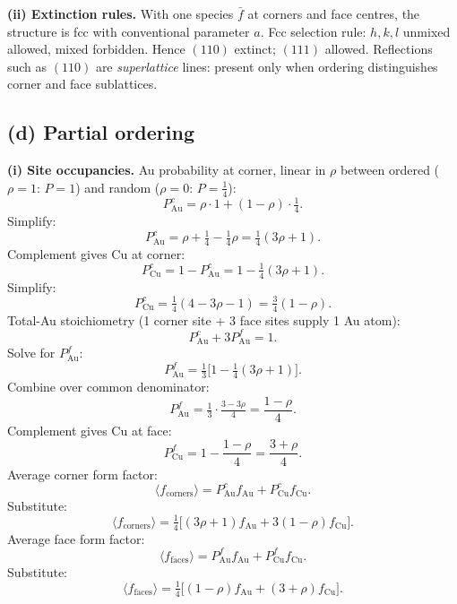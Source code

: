 \documentclass[11pt]{article}
\begin{document}
\textbf{(ii) Extinction rules.} With one species $\bar f$ at corners and face centres, the structure is fcc with conventional parameter $a$. Fcc selection rule: $h,k,l$ unmixed allowed, mixed forbidden. Hence $(110)$ extinct; $(111)$ allowed. Reflections such as $(110)$ are \emph{superlattice} lines: present only when ordering distinguishes corner and face sublattices.

\begin{center}
\end{center}

\subsection*{(d) Partial ordering}

\textbf{(i) Site occupancies.} Au probability at corner, linear in $\rho$ between ordered ($\rho=1$: $P=1$) and random ($\rho=0$: $P=\tfrac14$):
\[ P^c_{\text{Au}}=\rho\cdot 1+(1-\rho)\cdot\tfrac14. \]
Simplify:
\[ P^c_{\text{Au}}=\rho+\tfrac14-\tfrac14\rho=\tfrac14(3\rho+1). \]
Complement gives Cu at corner:
\[ P^c_{\text{Cu}}=1-P^c_{\text{Au}}=1-\tfrac14(3\rho+1). \]
Simplify:
\[ P^c_{\text{Cu}}=\tfrac14(4-3\rho-1)=\tfrac34(1-\rho). \]
Total-Au stoichiometry (1 corner site + 3 face sites supply 1 Au atom):
\[ P^c_{\text{Au}}+3P^f_{\text{Au}}=1. \]
Solve for $P^f_{\text{Au}}$:
\[ P^f_{\text{Au}}=\tfrac13\bigl[1-\tfrac14(3\rho+1)\bigr]. \]
Combine over common denominator:
\[ P^f_{\text{Au}}=\tfrac13\cdot\tfrac{3-3\rho}{4}=\frac{1-\rho}{4}. \]
Complement gives Cu at face:
\[ P^f_{\text{Cu}}=1-\frac{1-\rho}{4}=\frac{3+\rho}{4}. \]
Average corner form factor:
\[ \langle f_{\text{corners}}\rangle=P^c_{\text{Au}}f_{\text{Au}}+P^c_{\text{Cu}}f_{\text{Cu}}. \]
Substitute:
\[ \langle f_{\text{corners}}\rangle=\tfrac14\bigl[(3\rho+1)f_{\text{Au}}+3(1-\rho)f_{\text{Cu}}\bigr]. \]
Average face form factor:
\[ \langle f_{\text{faces}}\rangle=P^f_{\text{Au}}f_{\text{Au}}+P^f_{\text{Cu}}f_{\text{Cu}}. \]
Substitute:
\begin{equation}
\boxed{\;\langle f_{\text{faces}}\rangle=\tfrac14\bigl[(1-\rho)f_{\text{Au}}+(3+\rho)f_{\text{Cu}}\bigr].\;}
\label{eq:avg-ff}
\end{equation}
\end{document}
